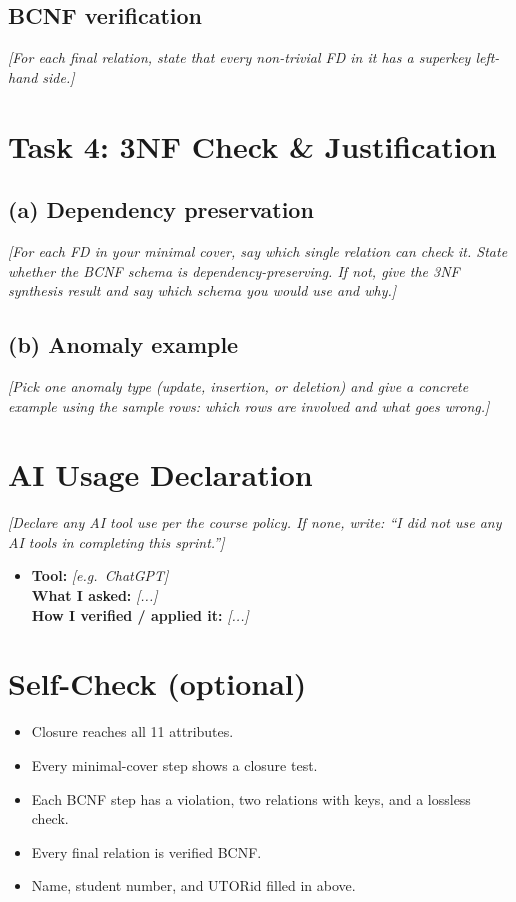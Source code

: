 \documentclass[11pt, letterpaper]{article}
\newcommand{\todo}[1]{{\color{muted}\textit{[#1]}}}    %
\begin{document}
\subsection*{BCNF verification}
\todo{For each final relation, state that every non-trivial FD in it has a superkey left-hand side.}

\section{Task 4: 3NF Check \& Justification}

\subsection*{(a) Dependency preservation}
\todo{For each FD in your minimal cover, say which single relation can check it. State whether the BCNF schema is dependency-preserving. If not, give the 3NF synthesis result and say which schema you would use and why.}

\subsection*{(b) Anomaly example}
\todo{Pick one anomaly type (update, insertion, or deletion) and give a concrete example using the sample rows: which rows are involved and what goes wrong.}

\section{AI Usage Declaration}

\todo{Declare any AI tool use per the course policy. If none, write: ``I did not use any AI tools in completing this sprint.''}

\begin{itemize}
  \item \textbf{Tool:} \todo{e.g.\ ChatGPT} \\
        \textbf{What I asked:} \todo{...} \\
        \textbf{How I verified / applied it:} \todo{...}
\end{itemize}

\section{Self-Check (optional)}

\begin{itemize}[itemsep=1pt]
  \item[$\square$] Closure reaches all 11 attributes.
  \item[$\square$] Every minimal-cover step shows a closure test.
  \item[$\square$] Each BCNF step has a violation, two relations with keys, and a lossless check.
  \item[$\square$] Every final relation is verified BCNF.
  \item[$\square$] Name, student number, and UTORid filled in above.
\end{itemize}
\end{document}
